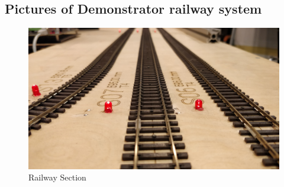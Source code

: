 \appendix
\chapter*{\fuggelek}
\setcounter{chapter}{\appendixnumber}

\section{Pictures of Demonstrator railway system} \label{appendix:HWPictures}
\begin{figure}[!h]
	\centering
	\includegraphics[width=150mm, keepaspectratio]{figures/modes3/section.jpg}
	\caption{Railway Section}
	\label{fig:section}
\end{figure}
%
%
%
%
